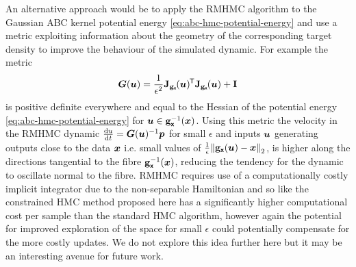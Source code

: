 An alternative approach would be to apply the \ac{RMHMC} algorithm to the Gaussian \ac{ABC} kernel potential energy \eqref{eq:abc-hmc-potential-energy} and use a metric exploiting information about the geometry of the corresponding target density to improve the behaviour of the simulated dynamic. For example the metric
\begin{equation}\label{eq:rmhmc-abc-metric}
  \mtx{G}(\vct{u}) = \frac{1}{\epsilon^2}\jacob{\genfunc_{\rvct{x}}}{\vct{u}}\phantom{}\tr\jacob{\genfunc_{\rvct{x}}}{\vct{u}} + \idmtx
\end{equation}  
is positive definite everywhere and equal to the Hessian of the potential energy \eqref{eq:abc-hmc-potential-energy} for $\boldsymbol{u} \in {\mathbf{g}}_{\boldsymbol{\mathsf{x}}}^{-1}(\boldsymbol{x})$. Using this metric the velocity in the \ac{RMHMC} dynamic $\frac{\mathrm{d} u}{\mathrm{d} t} = \boldsymbol{G}(\boldsymbol{u})^{-1}\boldsymbol{p}$ for small $\epsilon$ and inputs $\boldsymbol{u}$ generating outputs close to the data $\boldsymbol{x}$ i.e. small values of $\frac{1}{\epsilon}\left\Vert\genfunc_{\rvct{x}}(\vct{u}) - \vct{x}\right\Vert_2$, is higher along the directions tangential to the fibre ${\mathbf{g}}_{\boldsymbol{\mathsf{x}}}^{-1}(\boldsymbol{x})$, reducing the tendency for the dynamic to oscillate normal to the fibre. \ac{RMHMC} requires use of a computationally costly implicit integrator due to the non-separable Hamiltonian and so like the constrained \ac{HMC} method proposed here has a significantly higher computational cost per sample than the standard \ac{HMC} algorithm, however again the potential for improved exploration of the space for small $\epsilon$ could potentially compensate for the more costly updates. We do not explore this idea further here but it may be an interesting avenue for future work.




